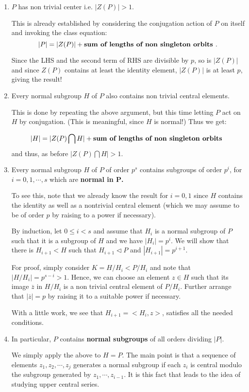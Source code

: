 \documentclass[12pt]{article}
\begin{document}
\begin{enumerate}
\item $P$ has non trivial center i.e. $|Z(P)|> 1$.

This is already
established by considering the conjugation action of $P$ on itself and
invoking the class equation:
$$|P| = |Z(P)| + \mbox{\bf sum of lengths of non singleton orbits }.$$

Since the LHS and the second term of RHS are divisible by $p$, so is
$|Z(P)|$ and since $Z(P)$ contains at least the identity element,
$|Z(P)|$ is at least $p$, giving the result!

\item Every normal subgroup $H$ of $P$ also contains non trivial central
elements.

This is done by repeating the above argument, but this time letting $P$
act on $H$ by conjugation. (This is meaningful, since $H$ is normal!)
Thus we get:

$$|H| = |Z(P)\bigcap H| + \mbox{\bf sum of lengths of non singleton orbits }$$
and thus, as before $|Z(P)\bigcap H|>1$.

\item Every normal subgroup $H$ of $P$ of order $p^s$ contains subgroups
of order $p^i$, for $i=0,1,\cdots,s$ which are {\bf normal in
$\mathbf{P}$.}

To see this, note that we already know the result for $i=0,1$ since $H$
contains the identity as well as a nontrivial central element (which we
may assume to be of order $p$ by raising to a power if necessary).

By induction, let $0\leq i <s $ and assume that $H_i$ is a normal
subgroup of $P$ such that
it is a subgroup of $H$ and we have $|H_i|=p^i$.
 We will show that there is $H_{i+1}<H$ such that
$H_{i+1}\triangleleft P$ and $|H_{i+1}|=p^{i+1}$.

For proof, simply consider $K=H/H_i < P/H_i$ and note that
$|H/H_i|=p^{s-i}>1$. Hence, we can choose an element $z\in H$ such that
its image $\overline{z}$ in $H/H_i$ is a non trivial central element of
$P/H_i$. Further arrange that $|\overline{z}|=p$ by raising it to a
suitable power if necessary.

With a little work, we see that $H_{i+1} =< H_i,z>$, satisfies all the
needed conditions.

\item In particular, $P$ contains {\bf normal subgroups} of all orders
dividing $|P|$.

We simply apply the above to $H=P$. The main point is that a sequence of
elements $z_1,z_2,\cdots,z_j$ generates a normal subgroup if each $z_i$
is central modulo the subgroup generated by $z_1,\cdots,z_{i-1}$. It is
this fact that leads to the idea of studying upper central series.


\end{enumerate}
\end{document}
